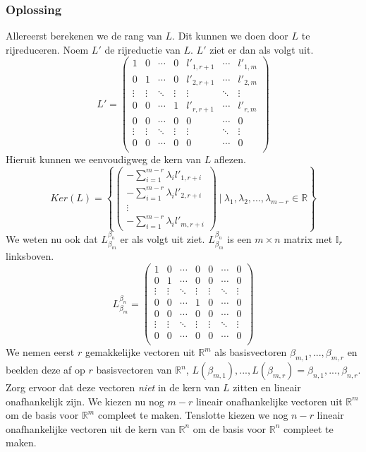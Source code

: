 \documentclass[lineaire_algebra_oplossingen.tex]{subfiles}
\begin{document}
\subsubsection*{Oplossing}
Allereerst berekenen we de rang van $L$. Dit kunnen we doen door $L$ te rijreduceren. Noem $L'$ de rijreductie van $L$. $L'$ ziet er dan als volgt uit.
\[
L' = 
\begin{pmatrix}
1 & 0 & \cdots & 0 & l'_{1,r+1} & \cdots & l'_{1,m}\\
0 & 1 & \cdots & 0 & l'_{2,r+1} & \cdots & l'_{2,m}\\
\vdots & \vdots & \ddots & \vdots & \vdots & \ddots & \vdots\\
0 & 0 & \cdots & 1 & l'_{r,r+1} & \cdots & l'_{r,m}\\
0 & 0 & \cdots & 0 & 0 & \cdots & 0\\
\vdots & \vdots & \ddots & \vdots & \vdots & \ddots & \vdots\\
0 & 0 & \cdots & 0 & 0 & \cdots & 0\\
\end{pmatrix}
\]
Hieruit kunnen we eenvoudigweg de kern van $L$ aflezen.
\[
Ker(L) = 
\left\{
\begin{pmatrix}
-\sum_{i=1}^{m-r} \lambda_il'_{1,r+i}\\
-\sum_{i=1}^{m-r} \lambda_il'_{2,r+i}\\
\vdots\\
-\sum_{i=1}^{m-r} \lambda_il'_{m,r+i}
\end{pmatrix}
\ |\ 
\lambda_1,\lambda_2,...,\lambda_{m-r} \in \mathbb{R}
\right\}
\]
We weten nu ook dat $L_{\beta_m}^{\beta_n}$ er als volgt uit ziet. $L_{\beta_m}^{\beta_n}$ is een $m\times n$ matrix met $\mathbb{I}_r$ linksboven.
\[
L_{\beta_m}^{\beta_n} = 
\begin{pmatrix}
1 & 0 & \cdots & 0 & 0 & \cdots & 0\\
0 & 1 & \cdots & 0 & 0 & \cdots & 0\\
\vdots & \vdots & \ddots & \vdots & \vdots & \ddots & \vdots\\
0 & 0 & \cdots & 1 & 0 & \cdots & 0\\
0 & 0 & \cdots & 0 & 0 & \cdots & 0\\
\vdots & \vdots & \ddots & \vdots & \vdots & \ddots & \vdots\\
0 & 0 & \cdots & 0 & 0 & \cdots & 0\\
\end{pmatrix}
\]
We nemen eerst $r$ gemakkelijke vectoren uit $\mathbb{R}^m$ als basisvectoren $\beta_{m,1},...,\beta_{m,r}$ en beelden deze af op $r$ basisvectoren van $\mathbb{R}^n$, $L(\beta_{m,1}),...,L(\beta_{m,r}) = \beta_{n,1},...,\beta_{n,r}$. Zorg ervoor dat deze vectoren \emph{niet} in de kern van $L$ zitten en lineair onafhankelijk zijn.
We kiezen nu nog $m-r$ lineair onafhankelijke vectoren uit $\mathbb{R}^m$ om de basis voor $\mathbb{R}^m$ compleet te maken. Tenslotte kiezen we nog $n-r$ lineair onafhankelijke vectoren uit de kern van $\mathbb{R}^n$ om de basis voor $\mathbb{R}^n$ compleet te maken.
\end{document}
